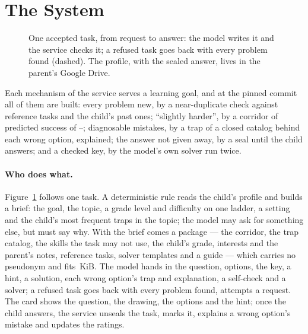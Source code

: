 \section{The System}
\label{sec:system}

\begin{figure}[t]
\centering

\caption{One accepted task, from request to answer: the model writes it and the service checks it; a refused task goes back with every problem found (dashed). The profile, with the sealed answer, lives in the parent's Google Drive.}
\label{fig:flow}
\end{figure}

Each mechanism of the service serves a learning goal, and at the pinned commit all of them are built: every problem new, by a near-duplicate check against reference tasks and the child's past ones; ``slightly harder'', by a corridor of predicted success of --; diagnosable mistakes, by a trap of a closed catalog behind each wrong option, explained; the answer not given away, by a seal until the child answers; and a checked key, by the model's own solver run twice.

\paragraph{Who does what.} Figure~\ref{fig:flow} follows one task. A deterministic rule reads the child's profile and builds a brief: the goal, the topic, a grade level and difficulty on one ladder, a setting and the child's  most frequent traps in the topic; the model may ask for something else, but must say why. With the brief comes a package --- the corridor, the trap catalog, the skills the task may not use, the child's grade, interests and the parent's notes,  reference tasks, solver templates and a guide --- which carries no pseudonym and fits \,KiB. The model hands in the question,  options, the key, a hint, a solution, each wrong option's trap and explanation, a self-check and a solver; a refused task goes back with every problem found,  attempts a request. The card shows the question, the drawing, the options and the hint; once the child answers, the service unseals the task, marks it, explains a wrong option's mistake and updates the ratings.

